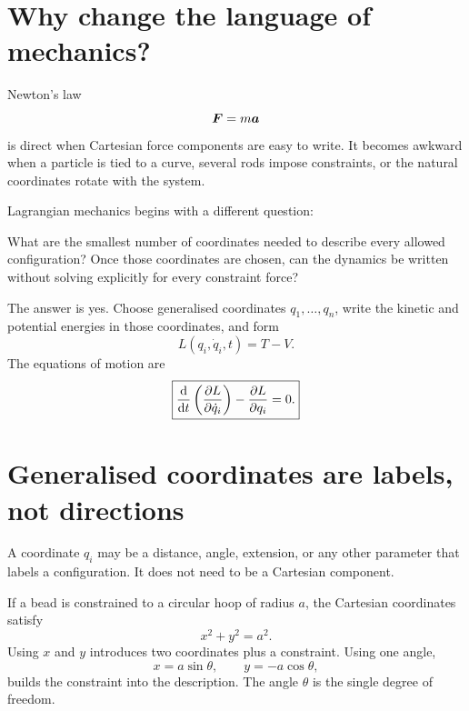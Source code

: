 \documentclass[11pt,a4paper]{article}
\begin{document}
\tableofcontents
\clearpage

\section{Why change the language of mechanics?}

Newton's law
\[
\bm{F}=m\bm{a}
\]
is direct when Cartesian force components are easy to write. It becomes awkward when a particle is tied to a curve, several rods impose constraints, or the natural coordinates rotate with the system.

Lagrangian mechanics begins with a different question:

\begin{intuition}
What are the smallest number of coordinates needed to describe every allowed configuration? Once those coordinates are chosen, can the dynamics be written without solving explicitly for every constraint force?
\end{intuition}

The answer is yes. Choose generalised coordinates $q_1,\ldots,q_n$, write the kinetic and potential energies in those coordinates, and form
\[
\boxed{L(q_i,\dot q_i,t)=T-V.}
\]
The equations of motion are
\[
\boxed{\frac{\mathop{}\!\mathrm d }{\mathop{}\!\mathrm d t}\left(\frac{\partial L}{\partial \dot q_i}\right)-\frac{\partial L}{\partial q_i}=0.}
\]

\section{Generalised coordinates are labels, not directions}

A coordinate $q_i$ may be a distance, angle, extension, or any other parameter that labels a configuration. It does not need to be a Cartesian component.

If a bead is constrained to a circular hoop of radius $a$, the Cartesian coordinates satisfy
\[
x^2+y^2=a^2.
\]
Using $x$ and $y$ introduces two coordinates plus a constraint. Using one angle,
\[
x=a\sin\theta,
\qquad
y=-a\cos\theta,
\]
builds the constraint into the description. The angle $\theta$ is the single degree of freedom.

\begin{center}
\end{center}
\end{document}
